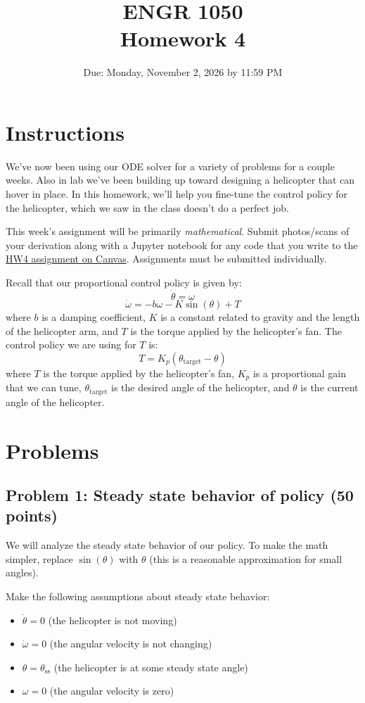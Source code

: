 \documentclass[12pt]{article}
\title{ENGR 1050 \\ Homework 4}
\author{Due: Monday, November 2, 2026 by 11:59 PM}
\date{}
\begin{document}
\maketitle

\section*{Instructions}
We've now been using our ODE solver for a variety of problems for a couple weeks. Also in lab we've been building up toward designing a helicopter that can hover in place. In this homework, we'll help you fine-tune the control policy for the helicopter, which we saw in the class doesn't do a perfect job.

This week's assignment will be primarily \textit{mathematical}. Submit photos/scans of your derivation along with a Jupyter notebook for any code that you write to the \href{https://canvas.upenn.edu/courses/1950130/assignments/15226407}{HW4 assignment on Canvas}. Assignments must be submitted individually.

Recall that our proportional control policy is given by:
\[ \dot{\theta} = \omega \]
\[ \dot{\omega} = - b \omega - K \sin(\theta) + T \]
where $b$ is a damping coefficient, $K$ is a constant related to gravity and the length of the helicopter arm, and $T$ is the torque applied by the helicopter's fan. The control policy we are using for $T$ is:
\[T = K_p (\theta_{\text{target}} - \theta) \]
where $T$ is the torque applied by the helicopter's fan, $K_p$ is a proportional gain that we can tune, $\theta_{\text{target}}$ is the desired angle of the helicopter, and $\theta$ is the current angle of the helicopter.

\section*{Problems}
\subsection*{Problem 1: Steady state behavior of policy (50 points)}
We will analyze the steady state behavior of our policy. To make the math simpler, replace $\sin(\theta)$ with $\theta$ (this is a reasonable approximation for small angles).

Make the following assumptions about steady state behavior:
\begin{itemize}
\item $\dot{\theta} = 0$ (the helicopter is not moving)
\item $\dot{\omega} = 0$ (the angular velocity is not changing)
\item $\theta = \theta_{\text{ss}}$ (the helicopter is at some steady state angle)
\item $\omega = 0$ (the angular velocity is zero)
\end{itemize}
\end{document}
